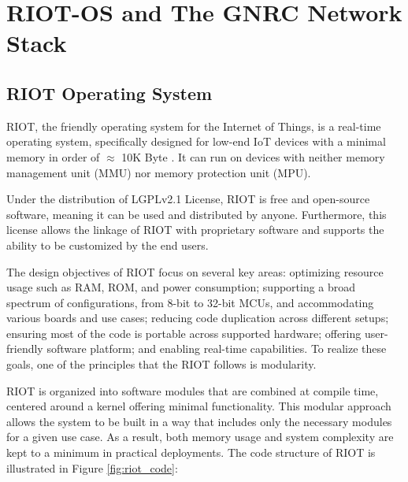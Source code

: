 \chapter{RIOT-OS and The GNRC Network Stack} \label{chap:gnrc}
\section{RIOT Operating System}
  RIOT, the friendly operating system for the Internet of Things, is a real-time operating system,
  specifically designed for low-end IoT devices with a minimal memory in order of $\approx$ 10K Byte
  \cite{riot}. It can run on devices with neither memory management unit (MMU) nor memory protection unit (MPU).

  Under the distribution of LGPLv2.1 License, RIOT is free and open-source software, meaning it can
  be used and distributed by anyone. Furthermore, this license allows the linkage of RIOT with
  proprietary software and supports the ability to be customized by the end users.

  The design objectives of RIOT focus on several key areas: optimizing resource usage such as RAM, 
  ROM, and power consumption; supporting a broad spectrum of configurations, from 8-bit to 32-bit MCUs, 
  and accommodating various boards and use cases; reducing code duplication across different setups; 
  ensuring most of the code is portable across supported hardware; offering user-friendly software 
  platform; and enabling real-time capabilities. To realize these goals, one of the principles that
  the RIOT follows is modularity. 

  RIOT is organized into software modules that are combined at compile time, centered around a kernel 
  offering minimal functionality. This modular approach allows the system to be built in a way that includes 
  only the necessary modules for a given use case. As a result, both memory usage and system complexity 
  are kept to a minimum in practical deployments. The code structure of RIOT is illustrated in
  Figure \ref{fig:riot_code}:
  
